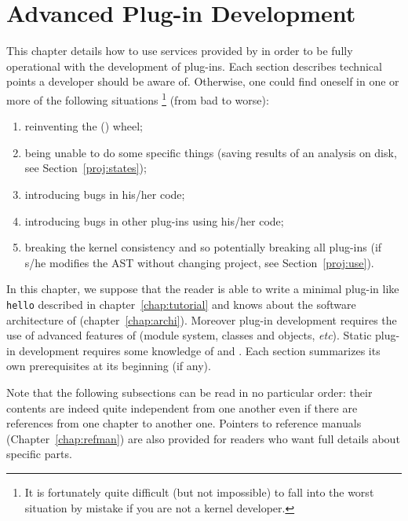 
\chapter{Advanced Plug-in Development}\label{chap:advance}
\lstset{language=Ocaml} %

This chapter details how to use services provided by \framac in order to be
fully operational with the development of plug-ins. Each section describes
technical points a developer should be aware of. Otherwise,
one could find oneself in one or more of the following situations
\footnote{It
  is fortunately quite difficult (but not impossible) to fall into the worst
  situation by mistake if you are not a kernel developer.}
(from bad to worse):
\begin{enumerate}
\item reinventing the (\framac) wheel;
\item being unable to do some specific things (\eg saving
  results of an analysis on disk, see
  Section~\ref{proj:states});
\item introducing bugs in his/her code;
\item introducing bugs in other plug-ins using his/her code;
\item breaking the kernel consistency and so potentially
  breaking all \framac plug-ins (\eg if s/he modifies the
  AST without changing project, see
  Section~\ref{proj:use}).
\end{enumerate}

In this chapter, we suppose that the reader is able to write a minimal plug-in
like \texttt{hello} described in chapter~\ref{chap:tutorial} and
knows about the software architecture of \framac (chapter~\ref{chap:archi}). Moreover
plug-in development requires the use of advanced features of
\caml (module system, classes and objects, \emph{etc}). Static plug-in
development requires some knowledge of \autoconf and \make.
 Each section summarizes its own prerequisites at its beginning (if any).

Note that the following subsections can be read in no particular
order: their contents are indeed quite independent from one another even if
there are references from one chapter to another one. Pointers to
reference manuals (Chapter~\ref{chap:refman}) are also provided for readers who
want full details about specific parts.

